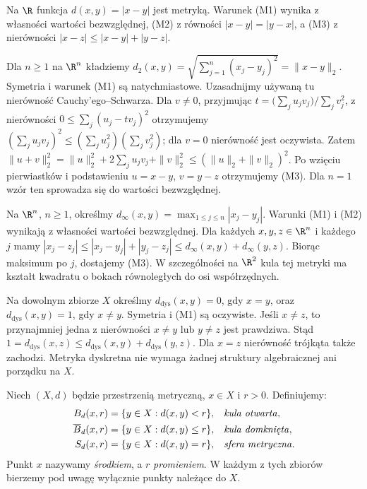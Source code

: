 \begin{przyklad}
\label{ex:topog-metryka-euklidesowa}
Na $\R$ funkcja $d(x,y)=|x-y|$ jest metryką.
Warunek (M1) wynika z własności wartości bezwzględnej,
(M2) z równości $|x-y|=|y-x|$, a (M3) z nierówności
$|x-z|\le |x-y|+|y-z|$.

Dla $n\ge1$ na $\R^n$ kładziemy
$d_2(x,y)=\sqrt{\sum_{j=1}^{n}(x_j-y_j)^2}=\|x-y\|_2$.
Symetria i warunek (M1) są natychmiastowe.
Uzasadnijmy używaną tu nierówność Cauchy'ego--Schwarza.
Dla $v\ne0$, przyjmując
$t=\bigl(\sum_j u_jv_j\bigr)/\sum_j v_j^2$, z nierówności
$0\le\sum_j(u_j-tv_j)^2$ otrzymujemy
$(\sum_j u_jv_j)^2\le(\sum_j u_j^2)(\sum_j v_j^2)$;
dla $v=0$ nierówność jest oczywista.
Zatem $\|u+v\|_2^2=\|u\|_2^2+2\sum_j u_jv_j+\|v\|_2^2
\le(\|u\|_2+\|v\|_2)^2$.
Po wzięciu pierwiastków i podstawieniu
$u=x-y$, $v=y-z$ otrzymujemy (M3).
Dla $n=1$ wzór ten sprowadza się do wartości bezwzględnej.
\end{przyklad}

\begin{przyklad}
\label{ex:topog-metryka-maksimum}
Na $\R^n$, $n\ge1$, określmy
$d_\infty(x,y)=\max_{1\le j\le n}|x_j-y_j|$.
Warunki (M1) i (M2) wynikają z własności wartości
bezwzględnej. Dla każdych $x,y,z\in\R^n$ i każdego $j$
mamy $|x_j-z_j|\le|x_j-y_j|+|y_j-z_j|
\le d_\infty(x,y)+d_\infty(y,z)$.
Biorąc maksimum po $j$, dostajemy (M3).
W szczególności na $\R^2$ kula tej metryki ma kształt
kwadratu o bokach równoległych do osi współrzędnych.
\end{przyklad}

\begin{przyklad}
\label{ex:topog-metryka-dyskretna}
Na dowolnym zbiorze $X$ określmy
$d_{\mathrm{dys}}(x,y)=0$, gdy $x=y$, oraz
$d_{\mathrm{dys}}(x,y)=1$, gdy $x\ne y$.
Symetria i (M1) są oczywiste. Jeśli $x\ne z$, to
przynajmniej jedna z nierówności $x\ne y$ lub $y\ne z$
jest prawdziwa. Stąd
$1=d_{\mathrm{dys}}(x,z)\le
 d_{\mathrm{dys}}(x,y)+d_{\mathrm{dys}}(y,z)$.
Dla $x=z$ nierówność trójkąta także zachodzi.
Metryka dyskretna nie wymaga żadnej struktury algebraicznej
ani porządku na $X$.
\end{przyklad}

\begin{definicja}
\label{def:topog-kule-sfera}
Niech $(X,d)$ będzie przestrzenią metryczną,
$x\in X$ i $r>0$. Definiujemy:
\begin{align*}
B_d(x,r)&=\{y\in X:d(x,y)<r\},
&&\text{\emph{kula otwarta}},\\
\overline B_d(x,r)&=\{y\in X:d(x,y)\le r\},
&&\text{\emph{kula domknięta}},\\
S_d(x,r)&=\{y\in X:d(x,y)=r\},
&&\text{\emph{sfera metryczna}}.
\end{align*}
Punkt $x$ nazywamy \emph{środkiem}, a $r$ \emph{promieniem}.
W każdym z tych zbiorów bierzemy pod uwagę wyłącznie
punkty należące do $X$.
\end{definicja}

